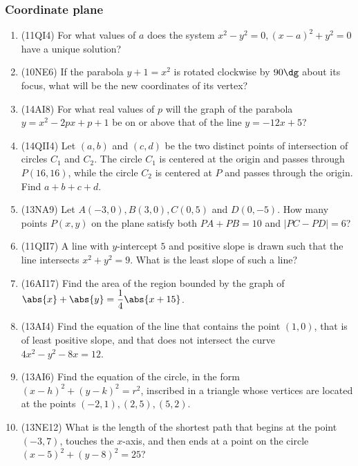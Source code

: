 \documentclass[10pt,paper=letter]{scrartcl}
\begin{document}
\subsubsection*{Coordinate plane}

\begin{enumerate}

\item (11QI4) For what values of $a$ does the system $x^2 - y^2 = 0, (x-a)^2 + y^2 = 0$ have a unique solution?

\item (10NE6) If the parabola $y + 1 = x^2$ is rotated clockwise by $90\dg$ about its focus, what will be the new coordinates of its vertex?

\item (14AI8) For what real values of $p$ will the graph of the parabola $y = x^2 - 2px + p + 1$ be on or above that of the line $y = -12x + 5$?

\item (14QII4) Let $(a, b)$ and $(c, d)$ be the two distinct points of intersection of circles $C_1$ and $C_2$. The circle $C_1$ is centered at the origin and passes through $P(16,16)$, while the circle $C_2$ is centered at $P$ and passes through the origin. Find $a+b+c+d$.

\item (13NA9) Let $A(-3, 0), B(3, 0), C(0, 5)$ and $D(0, -5)$. How many points $P(x, y)$ on the plane satisfy both $PA + PB = 10$ and $|PC - PD| = 6$?

\item (11QII7) A line with $y$-intercept $5$ and positive slope is drawn such that the line intersects $x^2+y^2=9$. What is the least slope of such a line?

\item (16AI17) Find the area of the region bounded by the graph of $\abs{x} + \abs{y} = \dfrac{1}{4}\abs{x+15}$.

\item (13AI4) Find the equation of the line that contains the point $(1, 0)$, that is of least positive slope, and that does not intersect the curve $4x^2 - y^2 - 8x = 12$.

\item (13AI6) Find the equation of the circle, in the form $(x - h)^2 + (y - k)^2 = r^2$, inscribed in a triangle whose vertices are located at the points $(-2, 1), (2, 5), (5, 2)$.

\item (13NE12) What is the length of the shortest path that begins at the point $(-3, 7)$, touches the $x$-axis, and then ends at a point on the circle $(x-5)^2 + (y-8)^2 = 25$?

\end{enumerate}
\end{document}
